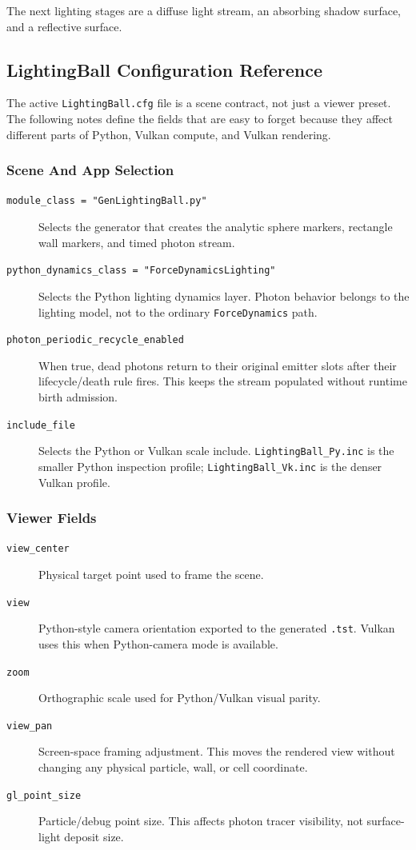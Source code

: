 The next lighting stages are a diffuse light stream, an absorbing shadow
surface, and a reflective surface.

\subsection{LightingBall Configuration Reference}

The active \texttt{LightingBall.cfg} file is a scene contract, not just a
viewer preset.  The following notes define the fields that are easy to forget
because they affect different parts of Python, Vulkan compute, and Vulkan
rendering.

\subsubsection{Scene And App Selection}

\begin{description}
    \item[\texttt{module\_class = "GenLightingBall.py"}] Selects the
    generator that creates the analytic sphere markers, rectangle wall
    markers, and timed photon stream.
    \item[\texttt{python\_dynamics\_class = "ForceDynamicsLighting"}]
    Selects the Python lighting dynamics layer.  Photon behavior belongs to
    the lighting model, not to the ordinary \texttt{ForceDynamics} path.
    \item[\texttt{photon\_periodic\_recycle\_enabled}] When true, dead photons
    return to their original emitter slots after their lifecycle/death rule
    fires.  This keeps the stream populated without runtime birth admission.
    \item[\texttt{include\_file}] Selects the Python or Vulkan scale include.
    \texttt{LightingBall\_Py.inc} is the smaller Python inspection profile;
    \texttt{LightingBall\_Vk.inc} is the denser Vulkan profile.
\end{description}

\subsubsection{Viewer Fields}

\begin{description}
    \item[\texttt{view\_center}] Physical target point used to frame the
    scene.
    \item[\texttt{view}] Python-style camera orientation exported to the
    generated \texttt{.tst}.  Vulkan uses this when Python-camera mode is
    available.
    \item[\texttt{zoom}] Orthographic scale used for Python/Vulkan visual
    parity.
    \item[\texttt{view\_pan}] Screen-space framing adjustment.  This moves the
    rendered view without changing any physical particle, wall, or cell
    coordinate.
    \item[\texttt{gl\_point\_size}] Particle/debug point size.  This affects
    photon tracer visibility, not surface-light deposit size.
\end{description}


